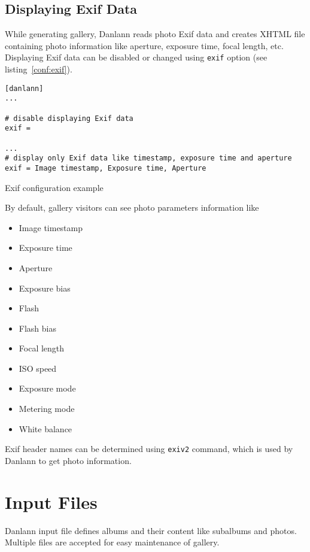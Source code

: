 \documentclass{article}
\begin{document}
\subsection{Displaying Exif Data}\label{exif}
While generating gallery, Danlann reads photo Exif data and creates
XHTML file containing photo information like aperture,
exposure time, focal length, etc. Displaying Exif data can be disabled
or changed using \texttt{exif} option (see listing~\ref{conf:exif}).

\begin{listing}
\begin{lstlisting}
[danlann]
...

# disable displaying Exif data
exif =

...
# display only Exif data like timestamp, exposure time and aperture
exif = Image timestamp, Exposure time, Aperture
\end{lstlisting}
\caption{Exif configuration example}\label{conf:exif}
\end{listing}

By default, gallery visitors can see photo parameters information like
\begin{itemize}
\item Image timestamp
\item Exposure time
\item Aperture
\item Exposure bias
\item Flash
\item Flash bias
\item Focal length
\item ISO speed
\item Exposure mode
\item Metering mode
\item White balance
\end{itemize}

Exif header names can be determined using \texttt{exiv2} command, which is
used by Danlann to get photo information.


\section{Input Files}\label{albums}
Danlann input file defines albums and their content like subalbums and
photos. Multiple files are accepted for easy maintenance of gallery.
\end{document}
